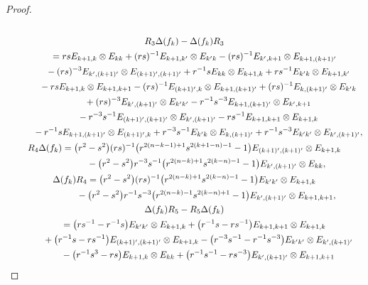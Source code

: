 \documentclass[pdftex]{sigma}
\numberwithin{equation}{section}
\begin{document}
\begin{proof}
\begin{gather*}
\\[0.2mm]
 R_{3}\Delta(f_{k}) - \Delta(f_{k})R_{3} \\[0.2mm]
 \qquad{}= rsE_{k + 1,k} \otimes E_{kk} + (rs)^{-1}E_{k + 1,k'} \otimes E_{k'k} - (rs)^{-1}E_{k',k + 1} \otimes E_{k + 1,(k + 1)'} \\[0.2mm]
 \quad\qquad{} - (rs)^{-3}E_{k',(k + 1)'} \otimes E_{(k + 1)',(k + 1)'} + r^{-1}sE_{kk} \otimes E_{k + 1,k} + rs^{-1}E_{k'k} \otimes E_{k + 1,k'} \\[0.2mm]
 \quad\qquad{} - rsE_{k + 1,k} \otimes E_{k + 1,k+1} - (rs)^{-1}E_{(k + 1)',k} \otimes E_{k + 1,(k + 1)'} + (rs)^{-1}E_{k,(k + 1)'} \otimes E_{k'k} \\[0.2mm]
 \quad\qquad{} + (rs)^{-3}E_{k',(k + 1)'} \otimes E_{k'k'} - r^{-1}s^{-3}E_{k + 1,(k + 1)'} \otimes E_{k',k + 1} \\[0.2mm]
 \quad\qquad{} - r^{-3}s^{-1}E_{(k + 1)',(k + 1)'} \otimes E_{k',(k + 1)'}- rs^{-1}E_{k + 1,k+1} \otimes E_{k + 1,k} \\[0.2mm]
 \quad\qquad{} - r^{-1}sE_{k + 1,(k + 1)'} \otimes E_{(k + 1)',k} + r^{-3}s^{-1}E_{k'k} \otimes E_{k,(k +1)'}+ r^{-1}s^{-3}E_{k'k'} \otimes E_{k',(k + 1)'},
\\[0.2mm]
 R_{4}\Delta(f_{k}) = \bigl(r^{2} - s^{2} \bigr)(rs)^{-1} \bigl(r^{2(n - k - 1) + 1}s^{2(k + 1 - n) - 1} - 1 \bigr)E_{(k + 1)',(k + 1)'} \otimes E_{k + 1,k} \\[0.2mm]
 \hphantom{R_{4}\Delta(f_{k}) =}{}
 - \bigl(r^{2} - s^{2} \bigr)r^{-3}s^{-1} \bigl(r^{2(n - k) + 1}s^{2(k - n) - 1} - 1 \bigr)E_{k',(k + 1)'} \otimes E_{kk},
 \\[0.2mm]
 \Delta(f_{k})R_{4} = \bigl(r^{2} - s^{2} \bigr)(rs)^{-1} \bigl(r^{2(n - k) + 1}s^{2(k - n) - 1} - 1 \bigr)E_{k'k'} \otimes E_{k + 1,k} \\[0.2mm]
 \hphantom{\Delta(f_{k})R_{4} = }{}
 - \bigl(r^{2} - s^{2} \bigr)r^{-1}s^{-3} \bigl(r^{2(n - k) - 1}s^{2(k - n) + 1} - 1 \bigr)E_{k',(k + 1)'} \otimes E_{k + 1,k+1},
\\[0.2mm]
 \Delta(f_{k})R_{5} - R_{5}\Delta(f_{k}) \\[0.2mm]
 \qquad{}= \bigl(rs^{-1} - r^{-1}s \bigr)E_{k'k'} \otimes E_{k + 1,k} + \bigl(r^{-1}s - rs^{-1} \bigr)E_{k + 1,k + 1} \otimes E_{k + 1,k} \\[0.2mm]
 \quad\qquad{} + \bigl(r^{-1}s - rs^{-1} \bigr)E_{(k + 1)',(k + 1)'} \otimes E_{k + 1,k} - \bigl(r^{-3}s^{-1} - r^{-1}s^{-3} \bigr)E_{k'k'} \otimes E_{k',(k + 1)'} \\[0.2mm]
 \quad\qquad{} - \bigl(r^{-1}s^{3} - rs \bigr)E_{k + 1,k} \otimes E_{kk} + \bigl(r^{-1}s^{-1} - rs^{-3} \bigr)E_{k',(k + 1)'} \otimes E_{k + 1,k + 1} \\[0.2mm]

\end{gather*}
\end{proof}
\end{document}
